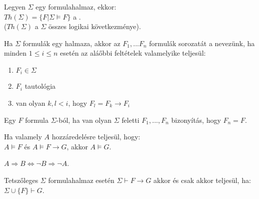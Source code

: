 \begin{frame}

\begin{tcolorbox}[title={Def.: Elmélet}]
Legyen $\Sigma$ egy formulahalmaz, ekkor:\\
\msmallskip
$Th({\Sigma}) = \{F | \Sigma \models F\}$ a .\\
($Th({\Sigma})$ a $\Sigma$ összes logikai következménye).
\end{tcolorbox}

\begin{tcolorbox}[title={Def.: Levezetés, bizonyítható formula}]
Ha $\Sigma$ formulák egy halmaza, akkor az $F_1, ... F_n$ formulák sorozatát a  nevezünk, ha minden $1 \leq i \leq n$ esetén az aláőbbi feltételek valamelyike teljesül:\\
\begin{enumerate}
\item $F_i \in \Sigma$
\item $F_i$ tautológia
\item van olyan $k, l < i$, hogy $F_l = F_k \rightarrow F_i$
\end{enumerate}
\mbigskip
Egy $F$ formula  $\Sigma$-ból, ha van olyan $\Sigma$ feletti $F_1, ..., F_n$ bizonyítás, hogy $F_n = F$.\\
\mbigskip
{}
\end{tcolorbox}

\end{frame}

\begin{frame}

\begin{tcolorbox}[title={Def.: Modus Ponens}]
Ha valamely $A$ hozzáredelésre teljesül, hogy:\\
$A \models F$ és $A \models F \rightarrow G$, akkor $A \models G$.
\end{tcolorbox}

\begin{tcolorbox}[title={Def.: Modus Tollens (Kontrapozíció)}]
$A \Rightarrow B \iff {\neg}B \Rightarrow {\neg}A$.
\end{tcolorbox}

\begin{tcolorbox}[title={Def.: Indirekt Bizonyítás}]
Tetszőleges $\Sigma$ formulahalmaz esetén $\Sigma \vdash F \rightarrow G$ akkor és csak akkor teljesül, ha:\\
$\Sigma \cup \{F\} \vdash G$.
\end{tcolorbox}

\end{frame}

